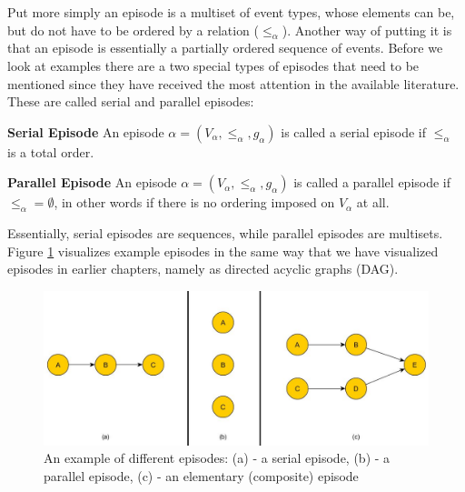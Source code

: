 Put more simply an episode is a multiset of event types, whose elements can be, but do not have to be ordered by a relation (${\leq}_{\alpha}$). Another way of putting it is that an episode is essentially a partially ordered sequence of events. Before we look at examples there are a two special types of episodes that need to be mentioned since they have received the most attention in the available literature. These are called serial and parallel episodes:

\begin{mydef}
\textbf{Serial Episode} An episode $\alpha = (V_\alpha,{\leq}_{\alpha},g_\alpha)$ is called a serial episode if ${\leq}_{\alpha}$ is a total order. \cite{mannila1995discovering}
\end{mydef}

\begin{mydef}
\textbf{Parallel Episode} An episode $\alpha = (V_\alpha,{\leq}_{\alpha},g_\alpha)$ is called a parallel episode if ${\leq}_{\alpha} = \emptyset$, in other words if there is no ordering imposed on $V_\alpha$ at all. \cite{mannila1995discovering}
\end{mydef}

Essentially, serial episodes are sequences, while parallel episodes are multisets. Figure \ref{fig_exampleEpisodes} visualizes example episodes in the same way that we have visualized episodes in earlier chapters, namely as directed acyclic graphs (DAG).

\begin{figure}[h]
	\centering
  	\includegraphics[width=\textwidth]{exampleEpisodes}
	\caption{An example of different episodes: (a) - a serial episode, (b) - a parallel episode, (c) - an elementary (composite) episode}
	\label{fig_exampleEpisodes}
\end{figure}


